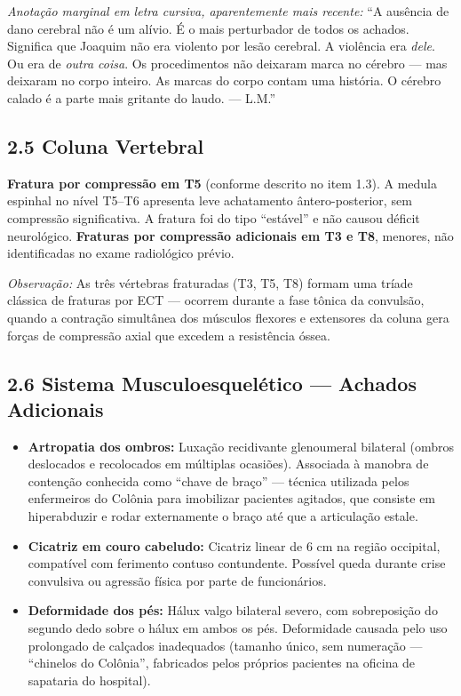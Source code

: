 \textit{Anotação marginal em letra cursiva, aparentemente mais recente:} ``A ausência de dano cerebral não é um alívio. É o mais perturbador de todos os achados. Significa que Joaquim não era violento por lesão cerebral. A violência era \textit{dele}. Ou era de \textit{outra coisa}. Os procedimentos não deixaram marca no cérebro --- mas deixaram no corpo inteiro. As marcas do corpo contam uma história. O cérebro calado é a parte mais gritante do laudo. --- L.M.''

\subsection*{2.5 Coluna Vertebral}

\textbf{Fratura por compressão em T5} (conforme descrito no item 1.3). A medula espinhal no nível T5--T6 apresenta leve achatamento ântero-posterior, sem compressão significativa. A fratura foi do tipo ``estável'' e não causou déficit neurológico. \textbf{Fraturas por compressão adicionais em T3 e T8}, menores, não identificadas no exame radiológico prévio.

\textit{Observação:} As três vértebras fraturadas (T3, T5, T8) formam uma tríade clássica de fraturas por ECT --- ocorrem durante a fase tônica da convulsão, quando a contração simultânea dos músculos flexores e extensores da coluna gera forças de compressão axial que excedem a resistência óssea.

\subsection*{2.6 Sistema Musculoesquelético --- Achados Adicionais}

\begin{itemize}
    \item \textbf{Artropatia dos ombros:} Luxação recidivante glenoumeral bilateral (ombros deslocados e recolocados em múltiplas ocasiões). Associada à manobra de contenção conhecida como ``chave de braço'' --- técnica utilizada pelos enfermeiros do Colônia para imobilizar pacientes agitados, que consiste em hiperabduzir e rodar externamente o braço até que a articulação estale.
    \item \textbf{Cicatriz em couro cabeludo:} Cicatriz linear de 6 cm na região occipital, compatível com ferimento contuso contundente. Possível queda durante crise convulsiva ou agressão física por parte de funcionários.
    \item \textbf{Deformidade dos pés:} Hálux valgo bilateral severo, com sobreposição do segundo dedo sobre o hálux em ambos os pés. Deformidade causada pelo uso prolongado de calçados inadequados (tamanho único, sem numeração --- ``chinelos do Colônia'', fabricados pelos próprios pacientes na oficina de sapataria do hospital).
\end{itemize}

